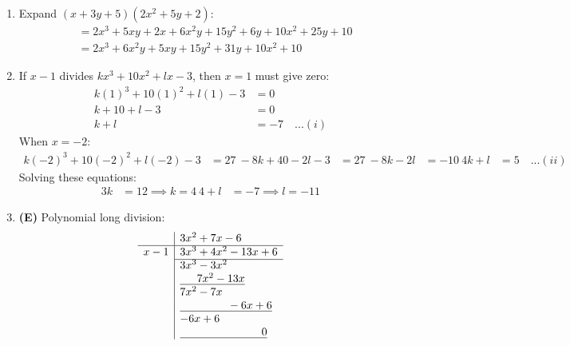 \begin{multicols}{2}
\begin{enumerate}[label={\textbf{\arabic*.}}]
\item Expand $(x + 3y + 5)(2x^2 + 5y + 2)$:
    \begin{align*}
    &= 2x^3 + 5xy + 2x + 6x^2y + 15y^2 + 6y + 10x^2 + 25y + 10 \\
    &= 2x^3 + 6x^2y + 5xy + 15y^2 + 31y + 10x^2 + 10
    \end{align*}
    \item If $x-1$ divides $kx^3 + 10x^2 + lx - 3$, then $x = 1$ must give zero:
    \begin{align*}
    k(1)^3 + 10(1)^2 + l(1) - 3 &= 0 \\
    k + 10 + l - 3 &= 0 \\
    k + l &= -7 \quad ...(i)
    \end{align*}
    When $x = -2$:
    \begin{align*}
    k(-2)^3 + 10(-2)^2 + l(-2) - 3 &= 27 \
    -8k + 40 - 2l - 3 &= 27 \
    -8k - 2l &= -10 \
    4k + l &= 5 \quad ...(ii)
    \end{align*}
    Solving these equations:
    \begin{align*}
    3k &= 12 \implies k = 4 \
    4 + l &= -7 \implies l = -11
    \end{align*}

    \item \textbf{(E)} Polynomial long division:
        \[
        \begin{array}{r|l}
        & 3x^2 + 7x - 6 \\
        \hline
        x-1 & 3x^3 + 4x^2 - 13x + 6 \\
        \cline{2-2}
        & 3x^3 - 3x^2 \\
        & \underline{\phantom{3x^3} 7x^2 - 13x} \\
        & 7x^2 - 7x \\
        & \underline{\phantom{3x^3 + 7x^2} -6x + 6} \\
        & -6x + 6 \\
        & \underline{\phantom{3x^3 + 7x^2 - 6x +} 0}
        \end{array}
        \]


\end{enumerate}
\end{multicols}
